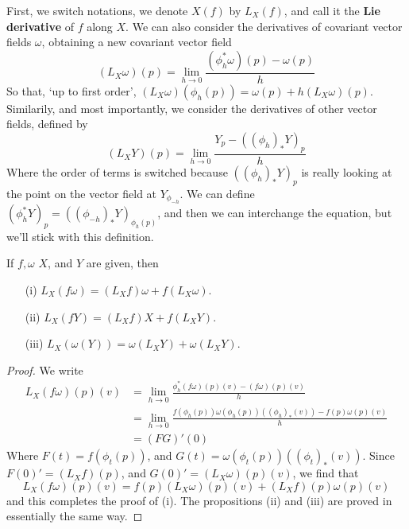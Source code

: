 First, we switch notations, we denote $X(f)$ by $L_X(f)$, and call it the {\bf Lie derivative} of $f$ along $X$. We can also consider the derivatives of covariant vector fields $\omega$, obtaining a new covariant vector field
%
\[ (L_X \omega)(p) = \lim_{h \to 0} \frac{(\phi_h^*\omega)(p) - \omega(p)}{h} \]
%
So that, `up to first order', $(L_X \omega)(\phi_h(p)) = \omega(p) + h (L_X \omega)(p)$. Similarily, and most importantly, we consider the derivatives of other vector fields, defined by
%
\[ (L_X Y)(p) = \lim_{h \to 0} \frac{Y_p - ((\phi_h)_* Y)_p}{h} \]
%
Where the order of terms is switched because $((\phi_h)_* Y)_p$ is really looking at the point on the vector field at $Y_{\phi_{-h}}$. We can define $(\phi_h^* Y)_p = ((\phi_{-h})_* Y)_{\phi_h(p)}$, and then we can interchange the equation, but we'll stick with this definition.

\begin{theorem}
    If $f, \omega$ $X$, and $Y$ are given, then
    \begin{itemize}
        \item[(i)] $L_X(f \omega) = (L_X f) \omega + f (L_X \omega)$.
        \item[(ii)] $L_X(f Y) = (L_X f) X + f (L_X Y)$.
        \item[(iii)] $L_X(\omega(Y)) = \omega(L_X Y) + \omega(L_X Y)$.
    \end{itemize}
\end{theorem}
\begin{proof}
    We write
    \begin{align*}
        L_X(f \omega)(p)(v) &= \lim_{h \to 0} \frac{\phi_h^*(f \omega)(p)(v) - (f \omega)(p)(v)}{h}\\
        &= \lim_{h \to 0} \frac{f(\phi_h(p)) \omega(\phi_h(p))((\phi_h)_*(v)) - f(p) \omega(p)(v)}{h}\\
        &= (FG)'(0)
    \end{align*}
    Where $F(t) = f(\phi_t(p))$, and $G(t) = \omega(\phi_t(p))((\phi_t)_*(v))$. Since $F(0)' = (L_X f)(p)$, and $G(0)' = (L_X \omega)(p)(v)$, we find that
    \[ L_X(f \omega)(p)(v) = f(p) (L_X \omega)(p)(v) + (L_X f)(p) \omega(p)(v) \]
    and this completes the proof of (i). The propositions (ii) and (iii) are proved in essentially the same way.
\end{proof}

